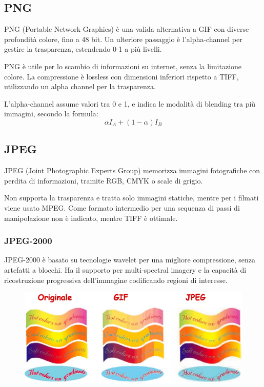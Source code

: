  \subsection{PNG}
 PNG (Portable Network Graphics) è una valida alternativa a GIF con diverse profondità colore, fino a 48 bit. Un ulteriore passaggio è l'alpha-channel per gestire la trasparenza, estendendo 0-1 a più livelli. 
 
 PNG è utile per lo scambio di informazioni su internet, senza la limitazione colore. La compressione è lossless con dimensioni inferiori rispetto a TIFF, utilizzando un alpha channel per la trasparenza.
 
 L'alpha-channel assume valori tra 0 e 1, e indica le modalità di blending tra più immagini, secondo la formula:
 $$\alpha I_A + (1 - \alpha) I_B$$
 
 \subsection{JPEG}
 JPEG (Joint Photographic Experts Group) memorizza immagini fotografiche con perdita di informazioni, tramite RGB, CMYK o scale di grigio.
 
 Non supporta la trasparenza e tratta solo immagini statiche, mentre per i filmati viene usato MPEG. Come formato intermedio per una sequenza di passi di manipolazione non è indicato, mentre TIFF è ottimale.
 
 \subsubsection{JPEG-2000}
 JPEG-2000 è basato su tecnologie wavelet per una migliore compressione, senza artefatti a blocchi. Ha il supporto per multi-spectral imagery e la capacità di ricostruzione progressiva dell'immagine codificando regioni di interesse.
 
 \begin{figure}[h]
 	\centering
 	\includegraphics[scale=0.4]{Lezioni/Immagini/formati}
 \end{figure}
 
